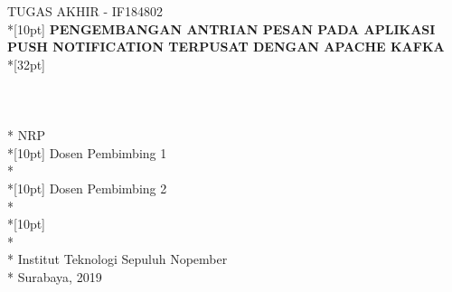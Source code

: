 \newpage

	\sffamily
	\thispagestyle{empty}
	\color{white}
	{ \noindent TUGAS AKHIR - IF184802 }\\*[10pt] 
	{\large\textbf{\MakeUppercase{Pengembangan Antrian Pesan pada Aplikasi Push Notification Terpusat dengan Apache Kafka}}} \\*[32pt]
	\\
	\\
	\\
	\MakeUppercase{\penulis} \\*
	NRP \nrp \\*[10pt]
	Dosen Pembimbing 1 \\*
	\pembimbingsatu \\*[10pt]
	Dosen Pembimbing 2 \\*
	\pembimbingdua \\*[10pt]
	\MakeUppercase{\jurusan} \\*
	\fakultas \\*
	Institut Teknologi Sepuluh Nopember \\*
	Surabaya, 2019
	\rmfamily
	\normalsize
	\restoregeometry
	\color{black}
	\cleardoublepage
	
